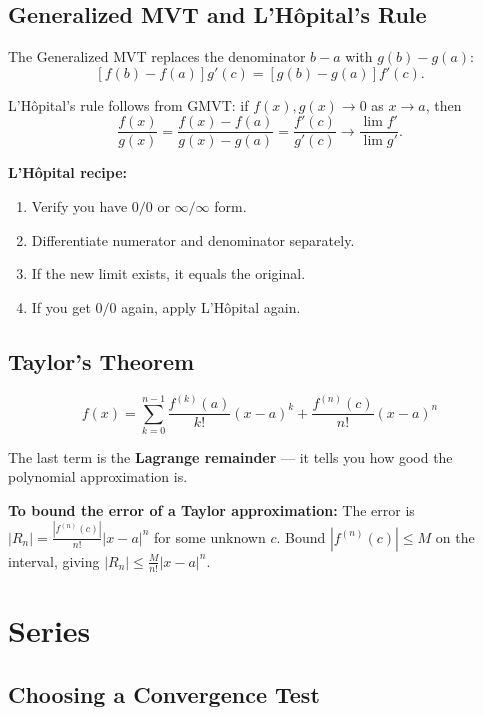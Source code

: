 \documentclass[11pt]{article}
\theoremstyle{definition}
\begin{document}
\subsection{Generalized MVT and L'H\^opital's Rule}

The Generalized MVT replaces the denominator $b - a$ with $g(b) - g(a)$:
$$[f(b) - f(a)] g'(c) = [g(b) - g(a)] f'(c).$$

L'H\^opital's rule follows from GMVT: if $f(x), g(x) \to 0$ as $x \to a$, then
$$\frac{f(x)}{g(x)} = \frac{f(x) - f(a)}{g(x) - g(a)} = \frac{f'(c)}{g'(c)} \to \frac{\lim f'}{\lim g'}.$$

\begin{application}
\textbf{L'H\^opital recipe:}
\begin{enumerate}
\item Verify you have $0/0$ or $\infty/\infty$ form.
\item Differentiate numerator and denominator separately.
\item If the new limit exists, it equals the original.
\item If you get $0/0$ again, apply L'H\^opital again.
\end{enumerate}
\end{application}

\subsection{Taylor's Theorem}

$$f(x) = \sum_{k=0}^{n-1} \frac{f^{(k)}(a)}{k!}(x-a)^k + \frac{f^{(n)}(c)}{n!}(x-a)^n$$

The last term is the \textbf{Lagrange remainder} --- it tells you how good the polynomial approximation is.

\begin{application}
\textbf{To bound the error of a Taylor approximation:} The error is $|R_n| = \frac{|f^{(n)}(c)|}{n!}|x-a|^n$ for some unknown $c$. Bound $|f^{(n)}(c)| \leq M$ on the interval, giving $|R_n| \leq \frac{M}{n!}|x-a|^n$.
\end{application}

\section{Series}

\subsection{Choosing a Convergence Test}
\end{document}
